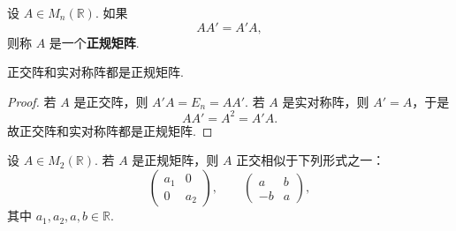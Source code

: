\begin{definition}\label{p1:concept:c6-l2295}
	设 $A\in M_n(\mathbb{R})$. 如果
	\[
	AA'=A'A,
	\]
	则称 $A$ 是一个\textbf{正规矩阵}.
\end{definition}

\begin{example}
	正交阵和实对称阵都是正规矩阵.
\end{example}
\begin{proof}
	若 $A$ 是正交阵，则 $A'A=E_n=AA'$. 若 $A$ 是实对称阵，则 $A'=A$，于是
	\[
	AA'=A^2=A'A.
	\]
	故正交阵和实对称阵都是正规矩阵.
\end{proof}




\begin{lemma}
	设 $A\in M_2(\mathbb{R})$. 若 $A$ 是正规矩阵，则 $A$ 正交相似于下列形式之一：
	\[
	\begin{pmatrix}
		a_1&0\\
		0&a_2
	\end{pmatrix},
	\qquad
	\begin{pmatrix}
		a&b\\
		-b&a
	\end{pmatrix},
	\]
	其中 $a_1,a_2,a,b\in\mathbb{R}$.
\end{lemma}

